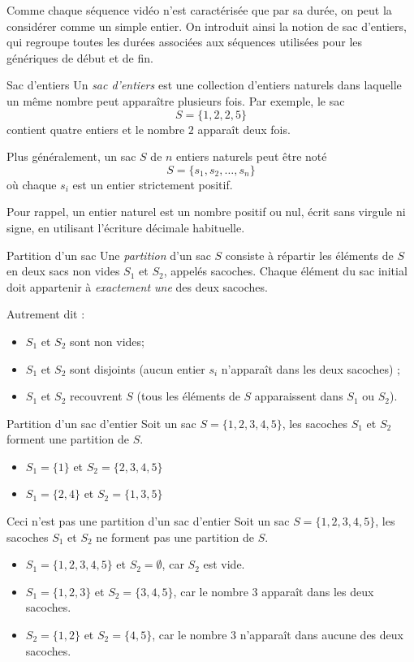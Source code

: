 \documentclass[a4paper,twoside]{article}
\begin{document}
Comme chaque séquence vidéo n'est caractérisée que par sa durée, on peut la considérer comme un simple entier.
On introduit ainsi la notion de sac d'entiers, qui regroupe toutes les durées associées aux séquences utilisées pour les génériques de début et de fin.
\begin{definition}{Sac d'entiers}
  Un \emph{sac d'entiers} est une collection d'entiers naturels dans laquelle un même nombre peut apparaître plusieurs fois.
  Par exemple, le sac
  $$S = \{1,2,2,5\}$$
  contient quatre entiers et le nombre $2$ apparaît deux fois.

  Plus généralement, un sac $S$ de $n$ entiers naturels peut être noté
  $$S = \{s_1,s_2,\dots,s_n\}$$
  où chaque $s_i$ est un entier strictement positif.
\end{definition}
Pour rappel, un entier naturel est un nombre positif ou nul, écrit sans virgule ni signe, en utilisant l'écriture décimale habituelle.

\begin{definition}{Partition d'un sac}
  Une \emph{partition} d'un sac $S$ consiste à répartir les éléments de $S$ en deux sacs non vides $S_1$ et $S_2$, appelés sacoches.
  Chaque élément du sac initial doit appartenir à \emph{exactement une} des deux sacoches.
\end{definition}
Autrement dit :
\begin{itemize}
\item $S_1$ et $S_2$ sont non vides; %
\item $S_1$ et $S_2$ sont disjoints (aucun entier $s_i$ n'apparaît dans les deux sacoches) ; %
\item $S_1$ et $S_2$ recouvrent $S$ (tous les éléments de $S$ apparaissent dans $S_1$ ou $S_2$).
\end{itemize}
\begin{exemple}{Partition d'un sac d'entier}
  Soit un sac $S = \{1,2,3,4,5\}$, les sacoches $S_1$ et $S_2$ forment une partition de $S$.
    \begin{itemize}
    \item $S_1 = \{1\}$ et $S_2 = \{2,3,4,5\}$
    \item $S_1 = \{2, 4\}$ et $S_2 = \{1,3,5\}$
    \end{itemize}
\end{exemple}

\begin{exemple}{Ceci n'est pas une partition d'un sac d'entier}
  Soit un sac $S = \{1,2,3,4,5\}$, les sacoches $S_1$ et $S_2$ ne forment pas une partition de $S$.
    \begin{itemize}
    \item $S_1 = \{1,2,3,4,5\}$ et $S_2 = \emptyset$, car $S_2$ est vide.
    \item $S_1 = \{1,2,3\}$ et $S_2 = \{3,4,5\}$, car le nombre 3 apparaît dans les deux sacoches.
    \item $S_2 = \{1,2\}$ et $S_2 = \{4, 5\}$, car le nombre 3 n'apparaît dans aucune des deux sacoches.
    \end{itemize}
\end{exemple}
\end{document}
